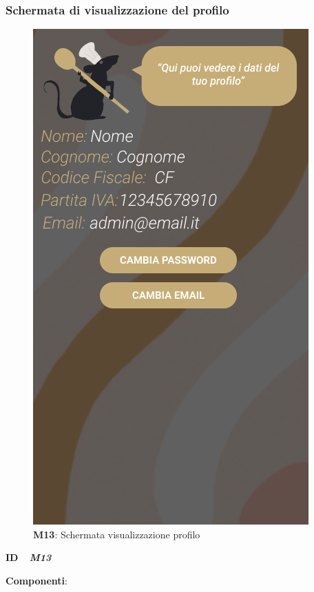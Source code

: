             \subsubsection{Schermata di visualizzazione del profilo}
              \begin{figure}[H]
                \centering
                \includegraphics[scale=0.5]{assets/diagrammi/Mockup/Mockup_Profile.png}
                \caption*{\textbf{M13}: Schermata visualizzazione profilo}\label{fig:Mockup_Profile}
              \end{figure}
    
              \begin{flushleft}
                \textbf{ID}   \ \Large{ \emph{\textbf{M13}}}
              \end{flushleft}
    
              \textbf{Componenti}:
              
